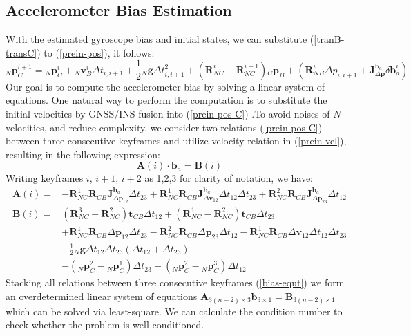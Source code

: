 \documentclass[journal,article,submit,moreauthors,pdftex]{Definitions/mdpi}
\begin{document}
\subsection{Accelerometer Bias Estimation}
With the estimated gyroscope bias and initial states, we can substitute (\ref{tranB-transC}) to (\ref{prein-pos}), it follows:
\begin{equation}
	{_N}\boldsymbol{p}_C^{i+1} = {_N}\boldsymbol{p}_C^{i} + {_N}\boldsymbol{v}_{B}^{i}\Delta{t}_{i,i+1} + \frac{1}{2}{_N}\boldsymbol{g}\Delta{t}_{i,i+1}^2 + (\boldsymbol{R}_{NC}^i-\boldsymbol{R}_{NC}^{i+1}){_C}\boldsymbol{p}_B +(\boldsymbol{R}_{NB}^i\Delta{p}_{i,i+1}+\boldsymbol{J}_{\Delta\boldsymbol{p}}^{\boldsymbol{b}_a}\delta\boldsymbol{b}_a^i)
	\label{prein-pos-C}
\end{equation}
Our goal is to compute the accelerometer bias by solving a linear system of equations. One natural way to perform the computation is to substitute the initial velocities by GNSS/INS fusion into (\ref{prein-pos-C}) .To avoid noises of $N$ velocities, and reduce complexity, we consider two relations (\ref{prein-pos-C}) between three consecutive keyframes and utilize velocity relation in (\ref{prein-vel}), resulting in the following expression: 
\begin{equation}
	\boldsymbol{A}(i) \cdot \boldsymbol{b}_a = \boldsymbol{B}(i)
	\label{bias-equt}
\end{equation}
Writing keyframes $i$, $i + 1$, $i + 2$ as 1,2,3 for clarity of notation, we have:
\begin{equation}
	\begin{aligned}
		\boldsymbol{A}(i) = & -\boldsymbol{R}_{NC}^1\boldsymbol{R}_{CB} \boldsymbol{J}_{\Delta\boldsymbol{p}_{12}}^{\boldsymbol{b}_a} \Delta{t}_{23} + \boldsymbol{R}_{NC}^1\boldsymbol{R}_{CB} \boldsymbol{J}_{\Delta\boldsymbol{v}_{12}}^{\boldsymbol{b}_a} \Delta{t}_{12}\Delta{t}_{23} + \boldsymbol{R}_{NC}^2\boldsymbol{R}_{CB} \boldsymbol{J}_{\Delta\boldsymbol{p}_{23}}^{\boldsymbol{b}_a} \Delta{t}_{12} \\
		\boldsymbol{B}(i) = & (\boldsymbol{R}_{NC}^3-\boldsymbol{R}_{NC}^2)\boldsymbol{t}_{CB}\Delta{t}_{12} + (\boldsymbol{R}_{NC}^1-\boldsymbol{R}_{NC}^2)\boldsymbol{t}_{CB}\Delta{t}_{23}\\
		& +\boldsymbol{R}_{NC}^1\boldsymbol{R}_{CB}\Delta\boldsymbol{p}_{12}\Delta{t}_{23} - \boldsymbol{R}_{NC}^2\boldsymbol{R}_{CB}\Delta\boldsymbol{p}_{23}\Delta{t}_{12} -\boldsymbol{R}_{NC}^1\boldsymbol{R}_{CB}\Delta\boldsymbol{v}_{12}\Delta{t}_{12}\Delta{t}_{23}\\
		&-\frac{1}{2}{_N}\boldsymbol{g}\Delta{t}_{12}\Delta{t}_{23}(\Delta{t}_{12}+\Delta{t}_{23}) \\
		&-({_N}\boldsymbol{p}_C^2-{_N}\boldsymbol{p}_C^1)\Delta{t}_{23}-({_N}\boldsymbol{p}_C^2-{_N}\boldsymbol{p}_C^3)\Delta{t}_{12}
	\end{aligned}
\end{equation}
Stacking all relations between three consecutive keyframes (\ref{bias-equt}) we form an overdetermined linear system of equations $\boldsymbol{A}_{3(n-2)\times 3}\boldsymbol{b}_{3\times1} = \boldsymbol{B}_{3(n-2)\times1}$ which can be solved via least-square. We can calculate the condition number to check whether the problem is well-conditioned.
\end{document}

